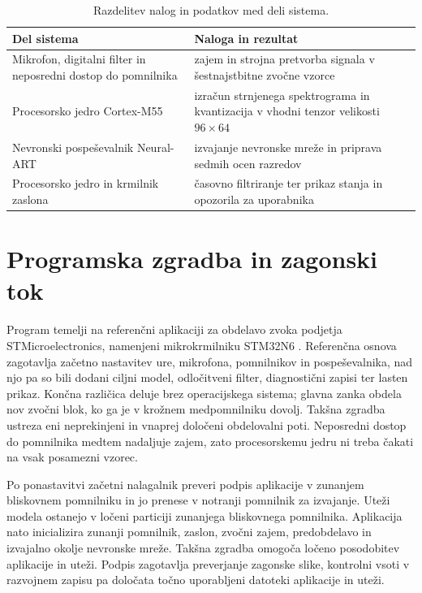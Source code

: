 \begin{table}[htbp]
  \centering
  \caption{Razdelitev nalog in podatkov med deli sistema.}
  \label{tab:delitev-nalog}
  \small
  \begin{tabular}{p{}p{}}
    \toprule
    Del sistema & Naloga in rezultat \\
    \midrule
    Mikrofon, digitalni filter in neposredni dostop do pomnilnika &
      zajem in strojna pretvorba signala v šestnajstbitne zvočne vzorce \\
    Procesorsko jedro Cortex-M55 &
      izračun strnjenega spektrograma in kvantizacija v vhodni tenzor velikosti $96 \times 64$ \\
    Nevronski pospeševalnik Neural-ART &
      izvajanje nevronske mreže in priprava sedmih ocen razredov \\
    Procesorsko jedro in krmilnik zaslona &
      časovno filtriranje ter prikaz stanja in opozorila za uporabnika \\
    \bottomrule
  \end{tabular}
\end{table}

\section{Programska zgradba in zagonski tok}

Program temelji na referenčni aplikaciji za obdelavo zvoka podjetja
STMicroelectronics, namenjeni mikrokrmilniku STM32N6 \cite{ststm32n6audio}.
Referenčna osnova zagotavlja začetno nastavitev ure,
mikrofona, pomnilnikov in pospeševalnika, nad njo pa so bili dodani ciljni
model, odločitveni filter, diagnostični zapisi ter lasten prikaz. Končna
različica deluje brez operacijskega sistema; glavna zanka obdela nov zvočni
blok, ko ga je v krožnem medpomnilniku dovolj. Takšna zgradba ustreza eni
neprekinjeni in vnaprej določeni obdelovalni poti. Neposredni dostop do
pomnilnika medtem nadaljuje zajem, zato procesorskemu jedru ni treba čakati na
vsak posamezni vzorec.

Po ponastavitvi začetni nalagalnik preveri podpis aplikacije v zunanjem
bliskovnem pomnilniku in jo prenese v notranji pomnilnik za izvajanje. Uteži
modela ostanejo v ločeni particiji zunanjega bliskovnega pomnilnika. Aplikacija
nato inicializira zunanji pomnilnik, zaslon, zvočni zajem, predobdelavo in
izvajalno okolje nevronske mreže. Takšna zgradba omogoča ločeno posodobitev
aplikacije in uteži. Podpis zagotavlja preverjanje zagonske slike, kontrolni
vsoti v razvojnem zapisu pa določata točno uporabljeni datoteki aplikacije in
uteži.

